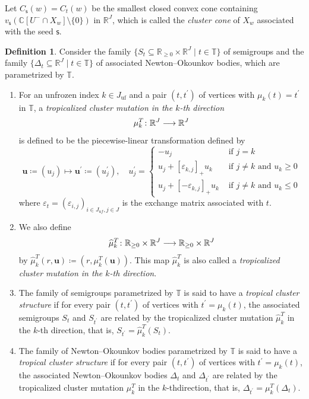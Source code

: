 \documentclass[11pt]{amsart}
\newcommand{\C}{\mathbb{C}}
\newcommand{\R}{\mathbb{R}}
\numberwithin{equation}{section}
\theoremstyle{plain}
\theoremstyle{definition}
\newtheorem{definition}[theorem]{Definition}
\def\to{\mathchoice{\longrightarrow}{\rightarrow}{\rightarrow}{\rightarrow}}
\numberwithin{equation}{section}
\newcommand{\seed}{\mathsf{s}}
\begin{document}
Let $C_{\seed}(w) = C_t(w)$ be the smallest closed convex cone containing $v_\seed ( \C[ U^- \cap X_w] \setminus \{ 0 \} )$ in $\R^{J}$, which is called the \emph{cluster cone} of $X_w$ associated with the seed $\seed$. 

\begin{definition}\label{definition_tropicalclusterstr}
Consider the family $\{ S_t \subseteq \R_{\geq 0} \times \R^J \mid t \in \mathbb{T} \}$ of semigroups and the family $\{ \Delta_t \subseteq \R^J \mid t \in \mathbb{T} \}$ of associated Newton--Okounkov bodies, which are parametrized by $\mathbb{T}$. 

\begin{enumerate}
\item For an unfrozen index $k \in J_\mathrm{uf}$ and a pair $(t, t^\prime)$ of vertices with $\mu_k (t) = t^\prime$ in  $\mathbb{T}$, a \emph{tropicalized cluster mutation in the $k$-th direction}
$$
\mu^{{T}}_k \colon \R^{J} \to \R^{J}
$$
is defined to be the piecewise-linear transformation defined by 
\begin{equation}\label{equ_tropical1}
\mathbf{u} \coloneqq (u_j) \mapsto \mathbf{u}^\prime \coloneqq (u^\prime_j), \quad 
u_j^\prime = 
\begin{cases}
- u_j &\mbox{ if $j = k$} \\
u_j + \left[ \varepsilon_{k,j} \right]_+ u_k  &\mbox{ if $j \neq k$ and $u_k \geq 0$} \\
u_j + \left[ -\varepsilon_{k,j} \right]_+ u_k &\mbox{ if $j \neq k$ and $u_k \leq 0$}
\end{cases}
\end{equation}
where ${\varepsilon}_t = (\varepsilon_{i,j})_{i \in J_{uf}, j \in J}$ is the exchange matrix associated with $t$. 
\item We also define 
\begin{equation}\label{equ_hattropical1}
\widehat{\mu}^{{T}}_k \colon \R_{\geq 0} \times \R^{J} \to \R_{\geq 0} \times \R^{J}
\end{equation}
by $\widehat{\mu}^{{T}}_k (r, \mathbf{u}) \coloneqq (r, \mu^{{T}}_k (\mathbf{u}))$. This map $\widehat{\mu}^{{T}}_k$ is also called a \emph{tropicalized cluster mutation in the $k$-th direction}.

\item The family of semigroups parametrized by $\mathbb{T}$ is said to have a \emph{tropical cluster structure} if for every pair $(t, t^\prime)$ of vertices with $t^\prime = \mu_k (t)$, the associated semigroups $S_t$ and $S_{t^\prime}$ are related by the tropicalized cluster mutation $\widehat{\mu}^T_k$ in the $k$-th direction, that is, $S_{t^\prime} = \widehat{\mu}^T_k (S_t)$.

\item The family of Newton--Okounkov bodies parametrized by $\mathbb{T}$ is said to have a \emph{tropical cluster structure} if for every pair $(t, t^\prime)$ of vertices with $t^\prime = \mu_k (t)$, the associated Newton--Okounkov bodies $\Delta_t$ and $\Delta_{t^\prime}$ are related by the tropicalized cluster mutation $\mu^T_k$ in the $k$-thdirection, that is, $\Delta_{t^\prime} = \mu^T_k (\Delta_t)$.
\end{enumerate}
\end{definition}
\end{document}
